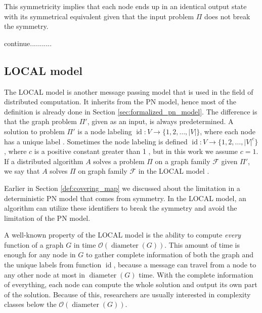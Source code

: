 

This symmetricity implies that each node ends up in an identical output state with its symmetrical equivalent given that the input problem $\Pi$ does not break the symmetry.

continue...........

\subsection{LOCAL model} \label{sec:local_model}
The LOCAL model is another message passing model that is used in the field of distributed computation.
It inherits from the PN model, hence most of the definition is already done in Section \ref{sec:formalized_pn_model}.
The difference is that the graph problem $\Pi'$, given as an input, is always predetermined.
A solution to problem $\Pi'$ is a node labeling $\operatorname{id}\colon V \rightarrow \{1,2,\dotsc,|V|\}$, where each node has a unique label \cite{DBLP:conf/focs/Linial87}.
Sometimes the node labeling is defined $\operatorname{id}\colon V \rightarrow \{1,2,\dotsc,|V|^c\}$, where $c$ is a positive constant greater than 1 \cite{HirvonenSuomelaDistAlg2020}, but in this work we assume $c=1$.
If a distributed algorithm $A$ solves a problem $\Pi$ on a graph family $\mathcal{F}$ given $\Pi'$, we say that $A$ solves $\Pi$ on graph family $\mathcal{F}$ in the LOCAL model \cite{HirvonenSuomelaDistAlg2020}.

Earlier in Section \ref{def:covering_map} we discussed about the limitation in a deterministic PN model that comes from symmetry.
In the LOCAL model, an algorithm can utilize these identifiers to break the symmetry and avoid the limitation of the PN model.

A well-known property of the LOCAL model is the ability to compute \emph{every} function of a graph $G$ in time $\mathcal{O}(\operatorname{diameter}(G))$.
This amount of time is enough for any node in $G$ to gather complete information of both the graph and the unique labels from function $\operatorname{id}$, because a message can travel from a node to any other node at most in $\operatorname{diameter}(G)$ time.
With the complete information of everything, each node can compute the whole solution and output its own part of the solution.
Because of this, researchers are usually interested in complexity classes below the $\mathcal{O}(\operatorname{diameter}(G))$.

